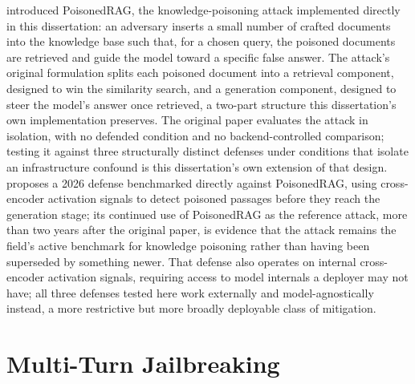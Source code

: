 \citet{zou2025poisonedrag} introduced PoisonedRAG, the knowledge-poisoning
attack implemented directly in this dissertation: an adversary inserts a
small number of crafted documents into the knowledge base such that, for
a chosen query, the poisoned documents are retrieved and guide the model
toward a specific false answer. The attack's original formulation splits
each poisoned document into a retrieval component, designed to win the
similarity search, and a generation component, designed to steer the
model's answer once retrieved, a two-part structure this dissertation's
own implementation preserves. The original paper evaluates the attack in
isolation, with no defended condition and no backend-controlled
comparison; testing it against three structurally distinct defenses
under conditions that isolate an infrastructure confound is this
dissertation's own extension of that design. \citet{moradi2026defending}
proposes a 2026 defense benchmarked directly against PoisonedRAG, using
cross-encoder activation signals to detect poisoned passages before they
reach the generation stage; its continued use of PoisonedRAG as the
reference attack, more than two years after the original paper, is
evidence that the attack remains the field's active benchmark for
knowledge poisoning rather than having been superseded by something
newer. That defense also operates on internal cross-encoder activation
signals, requiring access to model internals a deployer may not have;
all three defenses tested here work externally and model-agnostically
instead, a more restrictive but more broadly deployable class of
mitigation.

\section{Multi-Turn Jailbreaking}


